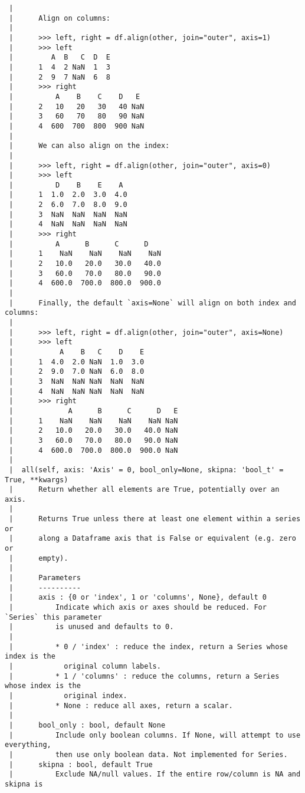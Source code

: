 \documentclass[
  letterpaper,
  DIV=11,
  numbers=noendperiod]{scrreprt}
\begin{document}
\begin{verbatim}
 |      
 |      Align on columns:
 |      
 |      >>> left, right = df.align(other, join="outer", axis=1)
 |      >>> left
 |         A  B   C  D  E
 |      1  4  2 NaN  1  3
 |      2  9  7 NaN  6  8
 |      >>> right
 |          A    B    C    D   E
 |      2   10   20   30   40 NaN
 |      3   60   70   80   90 NaN
 |      4  600  700  800  900 NaN
 |      
 |      We can also align on the index:
 |      
 |      >>> left, right = df.align(other, join="outer", axis=0)
 |      >>> left
 |          D    B    E    A
 |      1  1.0  2.0  3.0  4.0
 |      2  6.0  7.0  8.0  9.0
 |      3  NaN  NaN  NaN  NaN
 |      4  NaN  NaN  NaN  NaN
 |      >>> right
 |          A      B      C      D
 |      1    NaN    NaN    NaN    NaN
 |      2   10.0   20.0   30.0   40.0
 |      3   60.0   70.0   80.0   90.0
 |      4  600.0  700.0  800.0  900.0
 |      
 |      Finally, the default `axis=None` will align on both index and columns:
 |      
 |      >>> left, right = df.align(other, join="outer", axis=None)
 |      >>> left
 |           A    B   C    D    E
 |      1  4.0  2.0 NaN  1.0  3.0
 |      2  9.0  7.0 NaN  6.0  8.0
 |      3  NaN  NaN NaN  NaN  NaN
 |      4  NaN  NaN NaN  NaN  NaN
 |      >>> right
 |             A      B      C      D   E
 |      1    NaN    NaN    NaN    NaN NaN
 |      2   10.0   20.0   30.0   40.0 NaN
 |      3   60.0   70.0   80.0   90.0 NaN
 |      4  600.0  700.0  800.0  900.0 NaN
 |  
 |  all(self, axis: 'Axis' = 0, bool_only=None, skipna: 'bool_t' = True, **kwargs)
 |      Return whether all elements are True, potentially over an axis.
 |      
 |      Returns True unless there at least one element within a series or
 |      along a Dataframe axis that is False or equivalent (e.g. zero or
 |      empty).
 |      
 |      Parameters
 |      ----------
 |      axis : {0 or 'index', 1 or 'columns', None}, default 0
 |          Indicate which axis or axes should be reduced. For `Series` this parameter
 |          is unused and defaults to 0.
 |      
 |          * 0 / 'index' : reduce the index, return a Series whose index is the
 |            original column labels.
 |          * 1 / 'columns' : reduce the columns, return a Series whose index is the
 |            original index.
 |          * None : reduce all axes, return a scalar.
 |      
 |      bool_only : bool, default None
 |          Include only boolean columns. If None, will attempt to use everything,
 |          then use only boolean data. Not implemented for Series.
 |      skipna : bool, default True
 |          Exclude NA/null values. If the entire row/column is NA and skipna is

\end{verbatim}
\end{document}
